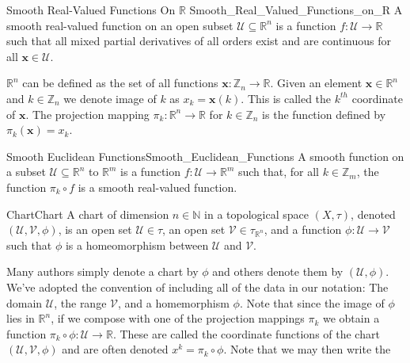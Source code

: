     \begin{fdefinition}{Smooth Real-Valued Functions On $\mathbb{R}$}
                       {Smooth_Real_Valued_Functions_on_R}
        A smooth real-valued function on an open subset
        $\mathcal{U}\subseteq\mathbb{R}^{n}$ is a function
        $f:\mathcal{U}\rightarrow\mathbb{R}$ such that all mixed partial
        derivatives of all orders exist and are continuous for all
        $\mathbf{x}\in\mathcal{U}$.
    \end{fdefinition}
    $\mathbb{R}^{n}$ can be defined as the set of all functions
    $\mathbf{x}:\mathbb{Z}_{n}\rightarrow\mathbb{R}$. Given an element
    $\mathbf{x}\in\mathbb{R}^{n}$ and $k\in\mathbb{Z}_{n}$ we denote image
    of $k$ as $x_{k}=\mathbf{x}(k)$. This is called the $k^{th}$ coordinate
    of $\mathbf{x}$. The projection mapping
    $\pi_{k}:\mathbb{R}^{n}\rightarrow\mathbb{R}$ for $k\in\mathbb{Z}_{n}$ is
    the function defined by $\pi_{k}(\mathbf{x})=x_{k}$.
    \begin{ldefinition}{Smooth Euclidean Functions}{Smooth_Euclidean_Functions}
        A smooth function on a subset $\mathcal{U}\subseteq\mathbb{R}^{n}$
        to $\mathbb{R}^{m}$ is a function
        $f:\mathcal{U}\rightarrow\mathbb{R}^{m}$ such that, for all
        $k\in\mathbb{Z}_{m}$, the function $\pi_{k}\circ{f}$ is a smooth
        real-valued function.
    \end{ldefinition}
    \begin{fdefinition}{Chart}{Chart}
        A chart of dimension $n\in\mathbb{N}$ in a topological space
        $(X,\tau)$, denoted $(\mathcal{U},\mathcal{V},\phi)$, is an open set
        $\mathcal{U}\in\tau$, an open set $\mathcal{V}\in\tau_{\mathbb{R}^{n}}$,
        and a function $\phi:\mathcal{U}\rightarrow\mathcal{V}$ such that $\phi$
        is a homeomorphism between $\mathcal{U}$ and $\mathcal{V}$.
    \end{fdefinition}
    Many authors simply denote a chart by $\phi$ and others denote them
    by $(\mathcal{U},\phi)$. We've adopted the convention of including all of
    the data in our notation: The domain $\mathcal{U}$, the range $\mathcal{V}$,
    and a homemorphism $\phi$. Note that since the image of $\phi$ lies in
    $\mathbb{R}^{n}$, if we compose with one of the projection mappings
    $\pi_{k}$ we obtain a function
    $\pi_{k}\circ\phi:\mathcal{U}\rightarrow\mathbb{R}$. These are called the
    coordinate functions of the chart $(\mathcal{U},\mathcal{V},\phi)$ and are
    often denoted $x^{k}=\pi_{k}\circ\phi$. Note that we may then write the
